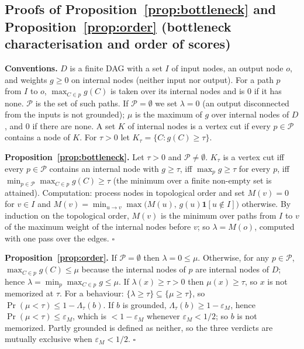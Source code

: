 \subsection{Proofs of Proposition~\ref{prop:bottleneck} and Proposition~\ref{prop:order}
(bottleneck characterisation and order of scores)}
\label{proof:P6}
\textbf{Conventions.} $D$ is a finite DAG with a set $I$ of input nodes, an
output node $o$, and weights $g\ge0$ on internal nodes (neither input nor
output). For a path $p$ from $I$ to $o$, $\max_{C\in p}g(C)$ is taken over
its internal nodes and is $0$ if it has none. $\mathcal{P}$ is the set of such
paths. If $\mathcal{P}=\emptyset$ we set $\lambda=0$ (an output disconnected
from the inputs is not grounded); $\mu$ is the maximum of $g$ over internal
nodes of $D$, and $0$ if there are none. A set $K$ of internal nodes is a
vertex cut if every $p\in\mathcal{P}$ contains a node of $K$. For $\tau>0$ let
$K_\tau=\{C:g(C)\ge\tau\}$.

\textbf{Proposition~\ref{prop:bottleneck}.} Let $\tau>0$ and $\mathcal{P}\ne\emptyset$.
$K_\tau$ is a vertex cut iff every $p\in\mathcal{P}$ contains an internal node
with $g\ge\tau$, iff $\max_{p}g\ge\tau$ for every $p$, iff
$\min_{p\in\mathcal{P}}\max_{C\in p}g(C)\ge\tau$ (the minimum over a finite
non-empty set is attained). Computation: process nodes in topological
order and set $M(v)=0$ for $v\in I$ and
$M(v)=\min_{u\to v}\max\bigl(M(u),\,g(u)\mathbf{1}[u\notin I]\bigr)$ otherwise.
By induction on the topological order, $M(v)$ is the minimum over paths from
$I$ to $v$ of the maximum weight of the internal nodes before $v$; so
$\lambda=M(o)$, computed with one pass over the edges. \hfill$\square$

\textbf{Proposition~\ref{prop:order}.} If $\mathcal{P}=\emptyset$ then $\lambda=0\le\mu$.
Otherwise, for any $p\in\mathcal{P}$, $\max_{C\in p}g(C)\le\mu$ because the
internal nodes of $p$ are internal nodes of $D$; hence
$\lambda=\min_p\max_{C\in p}g\le\mu$. If $\lambda(x)\ge\tau>0$ then
$\mu(x)\ge\tau$, so $x$ is not memorized at $\tau$.
For a behaviour: $\{\lambda\ge\tau\}\subseteq\{\mu\ge\tau\}$, so
$\Pr(\mu<\tau)\le1-\Lambda_\tau(b)$. If $b$ is grounded,
$\Lambda_\tau(b)\ge1-\varepsilon_M$, hence $\Pr(\mu<\tau)\le\varepsilon_M$,
which is $<1-\varepsilon_M$ whenever $\varepsilon_M<1/2$; so $b$ is not
memorized. Partly grounded is defined as neither, so the three verdicts are
mutually exclusive when $\varepsilon_M<1/2$. \hfill$\square$
